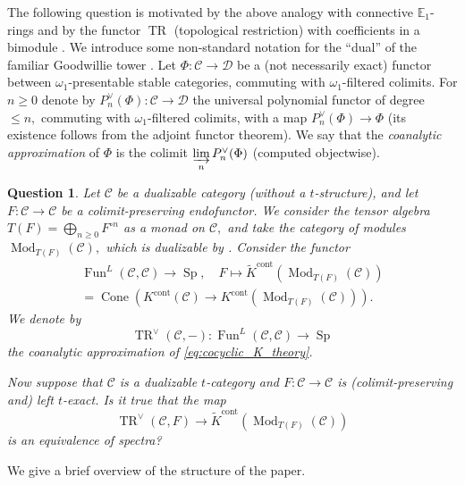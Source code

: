 \documentclass[11pt,leqno]{amsart}
\newtheorem{ques}[theo]{Question}
\numberwithin{equation}{section}
\def\wt{\widetilde}
\newcommand{\indlim}[1][]{\mathop{\varinjlim}\limits_{#1}}
\newcommand{\biggplus}[1][]{\mathop{\bigoplus}\limits_{#1}}
\newcommand{\Cone}{\operatorname{Cone}}
\newcommand{\cont}{\operatorname{cont}}
\newcommand{\bE}{{\mathbb E}}
\newcommand{\cD}{{\mathcal D}}
\newcommand{\cC}{{\mathcal C}}
\newcommand{\TR}{\operatorname{TR}}
\newcommand{\Fun}{\operatorname{Fun}}
\newcommand{\Sp}{\operatorname{Sp}}
\newcommand{\Mod}{\operatorname{Mod}}
\begin{document}
The following question is motivated by the above analogy with connective $\bE_1$-rings and by the functor $\TR$ (topological restriction) with coefficients in a bimodule \cite{LM12, KMN23}. We introduce some non-standard notation for the ``dual'' of the familiar Goodwillie tower \cite{Goo03}. Let $\Phi:\cC\to\cD$ be a (not necessarily exact) functor between $\omega_1$-presentable stable categories, commuting with $\omega_1$-filtered colimits. For $n\geq 0$ denote by $P_n^{\vee}(\Phi):\cC\to\cD$ the universal polynomial functor of degree $\leq n,$ commuting with $\omega_1$-filtered colimits, with a map $P_n^{\vee}(\Phi)\to \Phi$ (its existence follows from the adjoint functor theorem). We say that the {\it coanalytic approximation} of $\Phi$ is the colimit $\indlim[n]P_n^{\vee}(\Phi)$ (computed objectwise). 

\begin{ques}
Let $\cC$ be a dualizable category (without a $t$-structure), and let $F:\cC\to\cC$ be a colimit-preserving endofunctor. We consider the tensor algebra $T(F)=\biggplus[n\geq 0]F^{\circ n}$ as a monad on $\cC,$ and take the category of modules $\Mod_{T(F)}(\cC),$ which is dualizable by \cite[Proposition C.1]{E24}. Consider the functor
\begin{multline}\label{eq:cocyclic_K_theory}
\Fun^L(\cC,\cC)\to \Sp,\quad F\mapsto \wt{K}^{\cont}(\Mod_{T(F)}(\cC))\\
=\Cone(K^{\cont}(\cC)\to K^{\cont}(\Mod_{T(F)}(\cC))).
\end{multline}
We denote by
\begin{equation*}
\TR^{\vee}(\cC,-):\Fun^L(\cC,\cC)\to \Sp
\end{equation*}
the coanalytic approximation of \eqref{eq:cocyclic_K_theory}.

Now suppose that $\cC$ is a dualizable $t$-category and $F:\cC\to\cC$ is (colimit-preserving and) left $t$-exact. Is it true that the map
\begin{equation*}
\TR^{\vee}(\cC,F)\to \wt{K}^{\cont}(\Mod_{T(F)}(\cC))
\end{equation*}
is an equivalence of spectra?
\end{ques}

We give a brief overview of the structure of the paper.
\end{document}
